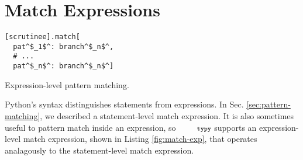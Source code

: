 \documentclass[10pt]{sigplanconf}
\newcommand{\typy}{\texttt{\footnotesize typy}}
\begin{document}
\section{Match Expressions}\label{appendix:match-expressions}
\begin{codelisting}[h!]
\vspace{-3px}
\begin{lstlisting}
[scrutinee].match[
  pat^$_1$^: branch^$_n$^, 
  # ...
  pat^$_n$^: branch^$_n$^]\end{lstlisting}
\caption{Expression-level pattern matching.}
\label{fig:match-exp}
\end{codelisting}

\noindent Python's syntax distinguishes statements from expressions. In Sec. \ref{sec:pattern-matching}, we described a statement-level match expression. It is also sometimes useful to pattern match inside an expression, so $\typy$ supports an expression-level match expression, shown in Listing \ref{fig:match-exp}, that operates analagously to the statement-level match expression. 
\fi
\end{document}
